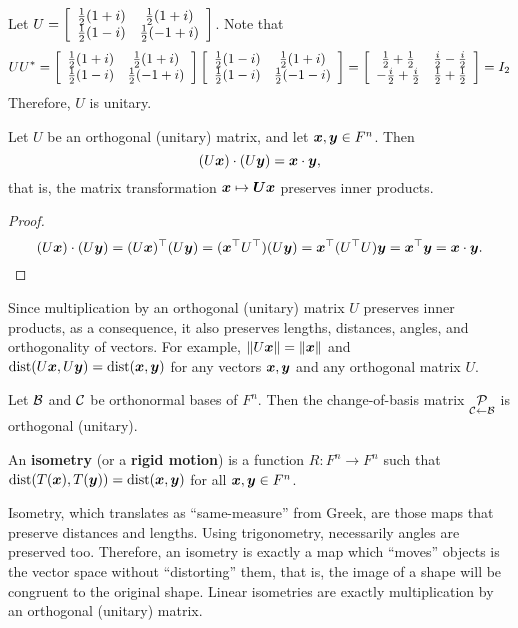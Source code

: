 \begin{Exam} Let $U = \mtx{cc}{ \frac{1}{2}(1+i) & \frac{1}{2}(1+i) \\ \frac{1}{2}(1-i) & \frac{1}{2}(-1+i)}$.  Note that 
\[UU^* = \mtx{cc}{ \frac{1}{2}(1+i) & \frac{1}{2}(1+i) \\ \frac{1}{2}(1-i) & \frac{1}{2}(-1+i)}\mtx{cc}{ \frac{1}{2}(1-i) & \frac{1}{2}(1+i) \\ \frac{1}{2}(1-i) & \frac{1}{2}(-1-i)} = \mtx{cc}{\frac{1}{2} + \frac{1}{2} & \frac{i}{2} - \frac{i}{2} \\ -\frac{i}{2} + \frac{i}{2} & \frac{1}{2} + \frac{1}{2}} = I_2\]
Therefore, $U$ is unitary.
\end{Exam}\vs

\begin{Thm} Let $U$ be an orthogonal (unitary) matrix, and let $\bb x, \bb y \in F^n$. Then \[(U\bb x)\cdot (U\bb y) = \bb x\cdot \bb y,\] that is, the matrix transformation $\bb x\mapsto \bb U\bb x$ preserves inner products.
\end{Thm}
\begin{proof}
\[(U\bb x)\cdot (U\bb y) = (U\bb x)^\top(U\bb y) =(\bb x^\top U^\top)(U\bb y)  = \bb x^\top(U^\top U)\bb y = \bb x^\top\bb y  = \bb x \cdot \bb y.\qedhere\]
\end{proof}\vs

Since multiplication by an orthogonal (unitary) matrix $U$ preserves inner products, as a consequence, it also preserves lengths, distances, angles, and orthogonality of vectors. For example, $\Vert U\bb x \Vert = \Vert \bb x\Vert$ and $\dist(U\bb x, U\bb y) = \dist(\bb x, \bb y)$ for any vectors $\bb x, \bb y$ and any orthogonal matrix $U$.\\

\begin{Thm} Let $\B$ and $\c$ be orthonormal bases of $F^n$. Then the change-of-basis matrix $\underset{\c \leftarrow \B}{\P}$ is orthogonal (unitary).
\end{Thm}\vs

\begin{Def} An \textbf{isometry} (or a \textbf{rigid motion}) is a function $R : F^n \to F^n$ such that $\dist(T(\bb x), T(\bb y)) = \dist(\bb x, \bb y)$ for all $\bb x, \bb y\in F^n$. \end{Def}\vs

Isometry, which translates as ``same-measure'' from Greek, are those maps that preserve distances and lengths. Using trigonometry, necessarily angles are preserved too. Therefore, an isometry is exactly a map which ``moves'' objects is the vector space without ``distorting'' them, that is, the image of a shape will be congruent to the original shape. Linear isometries are exactly multiplication by an orthogonal (unitary) matrix. \\

